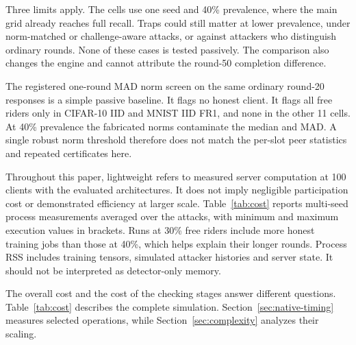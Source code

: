 \documentclass[journal]{IEEEtran}
\makeatletter
\renewcommand{\subsection}{\@startsection{subsection}{2}{\z@}{1.5ex}{0.7ex}{\normalfont\normalsize\itshape}}
\makeatother
\begin{document}


Three limits apply. The cells use one seed and 40\% prevalence, where
the main grid already reaches full recall. Traps could still matter at
lower prevalence, under norm-matched or challenge-aware attacks, or
against attackers who distinguish ordinary rounds. None of these cases
is tested passively. The comparison also changes the engine and cannot
attribute the round-50 completion difference.

The registered one-round MAD norm screen on the same ordinary round-20
responses is a simple passive baseline. It flags no honest client. It
flags all free riders only in CIFAR-10 IID and MNIST IID FR1, and none in
the other 11 cells. At 40\% prevalence the fabricated norms contaminate
the median and MAD. A single robust norm threshold therefore does not
match the per-slot peer statistics and repeated certificates here.

\subsection{Execution Time and Memory}
Throughout this paper, lightweight refers to measured server computation
at 100 clients with the evaluated architectures. It does not imply
negligible participation cost or demonstrated efficiency at larger scale.
Table~\ref{tab:cost} reports multi-seed process measurements averaged over
the attacks, with minimum and maximum execution values in brackets.
Runs at 30\% free riders include more honest training jobs than those at
40\%, which helps explain their longer rounds. Process RSS includes
training tensors, simulated attacker histories and server state.
It should not be interpreted as detector-only memory.

The overall cost and the cost of the checking stages answer different
questions. Table~\ref{tab:cost} describes the complete simulation.
Section~\ref{sec:native-timing} measures selected operations, while
Section~\ref{sec:complexity} analyzes their scaling.
\end{document}
